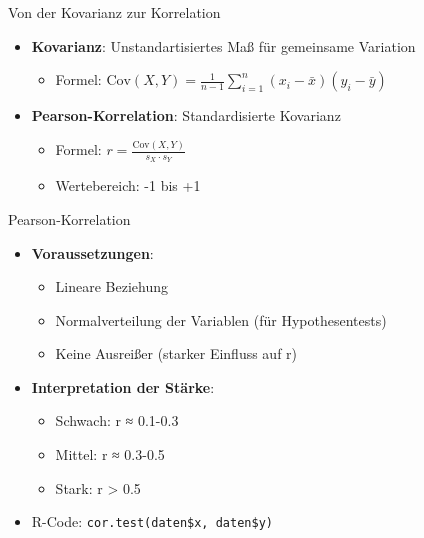\documentclass[
  ignorenonframetext,
]{beamer}
\providecommand{\tightlist}{%
  \setlength{\itemsep}{0pt}\setlength{\parskip}{0pt}}
\begin{document}
\begin{frame}{Von der Kovarianz zur Korrelation}
\protect{}\label{von-der-kovarianz-zur-korrelation}
\begin{itemize}
\tightlist
\item
  \textbf{Kovarianz}: Unstandartisiertes Maß für gemeinsame Variation

  \begin{itemize}
  \tightlist
  \item
    Formel:
    \(\text{Cov}(X,Y) = \frac{1}{n-1} \sum_{i=1}^{n} (x_i - \bar{x})(y_i - \bar{y})\)
  \end{itemize}
\item
  \textbf{Pearson-Korrelation}: Standardisierte Kovarianz

  \begin{itemize}
  \tightlist
  \item
    Formel: \(r = \frac{\text{Cov}(X,Y)}{s_X \cdot s_Y}\)
  \item
    Wertebereich: -1 bis +1
  \end{itemize}
\end{itemize}
\end{frame}

\begin{frame}[fragile]{Pearson-Korrelation}
\protect{}\label{pearson-korrelation}
\begin{itemize}
\item
  \textbf{Voraussetzungen}:

  \begin{itemize}
  \tightlist
  \item
    Lineare Beziehung
  \item
    Normalverteilung der Variablen (für Hypothesentests)
  \item
    Keine Ausreißer (starker Einfluss auf r)
  \end{itemize}
\item
  \textbf{Interpretation der Stärke}:

  \begin{itemize}
  \tightlist
  \item
    Schwach: \textbar r\textbar{} ≈ 0.1-0.3
  \item
    Mittel: \textbar r\textbar{} ≈ 0.3-0.5
  \item
    Stark: \textbar r\textbar{} \textgreater{} 0.5
  \end{itemize}
\item
  R-Code: \texttt{cor.test(daten\$x,\ daten\$y)}
\end{itemize}
\end{frame}
\end{document}
